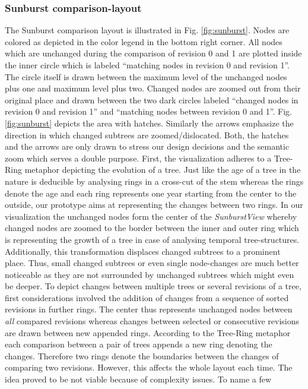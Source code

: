 \subsubsection{Sunburst comparison-layout}
The Sunburst comparison layout is illustrated in Fig. \ref{fig:sunburst}. Nodes are colored as depicted in the color legend in the bottom right corner. All nodes which are unchanged during the comparison of revision 0 and 1 are plotted inside the inner circle which is labeled ``matching nodes in revision 0 and revision 1''. The circle itself is drawn between the maximum level of the unchanged nodes plus one and maximum level plus two. Changed nodes are zoomed out from their original place and drawn between the two dark circles labeled ``changed nodes in revision 0 and revision 1'' and ``matching nodes between revision 0 and 1''. Fig. \ref{fig:sunburst} depicts the area with hatches. Similarly the arrows emphasize the direction in which changed subtrees are zoomed/dislocated. Both, the hatches and the arrows are only drawn to stress our design decisions and the semantic zoom which serves a double purpose. First, the visualization adheres to a Tree-Ring metaphor depicting the evolution of a tree. Just like the age of a tree in the nature is deducible by analysing rings in a cross-cut of the stem whereas the rings denote the age and each ring represents one year starting from the center to the outside, our prototype aims at representing the changes between two rings. In our visualization the unchanged nodes form the center of the \emph{SunburstView} whereby changed nodes are zoomed to the border between the inner and outer ring which is representing the growth of a tree in case of analysing temporal tree-structures. Additionally, this transformation displaces changed subtrees to a prominent place. Thus, small changed subtrees or even single node-changes are much better noticeable as they are not surrounded by unchanged subtrees which might even be deeper. To depict changes between multiple trees or several revisions of a tree, first considerations involved the addition of changes from a sequence of sorted revisions in further rings. The center thus represents unchanged nodes between \emph{all} compared revisions whereas changes between selected or consecutive revisions are drawn between new appended rings. According to the Tree-Ring metaphor each comparison between a pair of trees appends a new ring denoting the changes. Therefore two rings denote the boundaries between the changes of comparing two revisions. However, this affects the whole layout each time. The idea proved to be not viable because of complexity issues. To name a few

